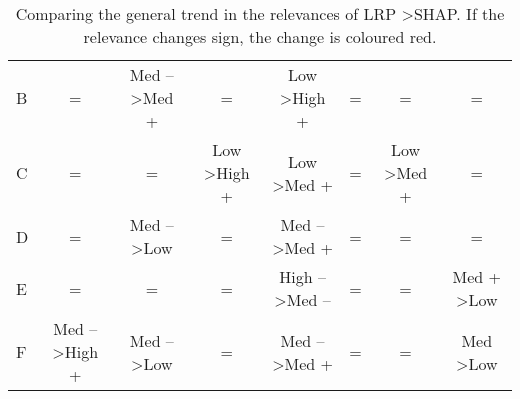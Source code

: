 \documentclass[a4paper]{article}
\begin{document}
\begin{table}
\begin{tabular}{l|ccccccc}
B                           & \multicolumn{1}{c|}{{=}}                                   & \multicolumn{1}{c|}{{\color[HTML]{FE0000} \hspace{2pt} Med -- \textgreater Med +}} & \multicolumn{1}{c|}{{=}}                                    & \multicolumn{1}{c|}{{Low \textgreater High +}}    & \multicolumn{1}{c|}{{=}}                                       & \multicolumn{1}{c|}{{=}}                                              & {=}                                              \\
C                           & \multicolumn{1}{c|}{{=}}                                   & \multicolumn{1}{c|}{{=}}                         & \multicolumn{1}{c|}{{\hspace{2pt} Low \textgreater High +}}              & \multicolumn{1}{c|}{{Low \textgreater Med +}}      & \multicolumn{1}{c|}{{=}}                                       & \multicolumn{1}{c|}{{Low \textgreater Med +}}                         & {=}                                              \\
D                           & \multicolumn{1}{c|}{{=}}                                   & \multicolumn{1}{c|}{{Med -- \textgreater Low}}   & \multicolumn{1}{c|}{{=}}                                    & \multicolumn{1}{c|}{{\color[HTML]{FE0000} \hspace{2pt} Med -- \textgreater Med +}}   & \multicolumn{1}{c|}{{=}}                                       & \multicolumn{1}{c|}{{=}}                                              & {=}                                              \\
E                           & \multicolumn{1}{c|}{{=}}                                   & \multicolumn{1}{c|}{{=}}                         & \multicolumn{1}{c|}{{=}}                                    & \multicolumn{1}{c|}{{\hspace{2pt} High -- \textgreater Med --}} & \multicolumn{1}{c|}{{=}}                                       & \multicolumn{1}{c|}{{=}}                                              & {Med + \textgreater Low}                         \\
F                           & \multicolumn{1}{c|}{{\color[HTML]{FE0000} \hspace{2pt} Med -- \textgreater High +}}          & \multicolumn{1}{c|}{{Med -- \textgreater Low}}   & \multicolumn{1}{c|}{{=}}                                    & \multicolumn{1}{c|}{{\color[HTML]{FE0000} \hspace{2pt} Med -- \textgreater Med +}}   & \multicolumn{1}{c|}{{=}}                                       & \multicolumn{1}{c|}{{=}}                                              & {Med \textgreater Low} 
\end{tabular}
\caption{Comparing the general trend in the relevances of LRP \textgreater SHAP. If the relevance changes sign, the change is coloured red.}\label{table:comparison}
\end{table}
\end{document}
